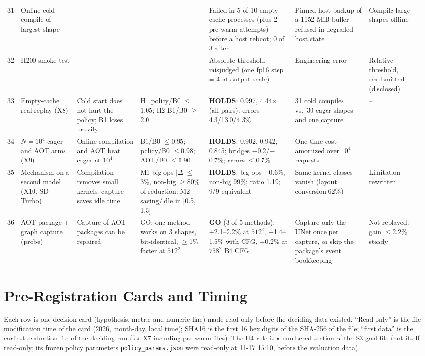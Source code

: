\documentclass[conference]{IEEEtran}
\newcommand{\tn}[1]{#1}%
\begin{document}
{\begin{longtable}{@{}P{0.4cm}P{2.2cm}P{2.6cm}P{2.6cm}P{3.3cm}P{3.2cm}P{2.2cm}@{}}
31 & Online cold compile of largest shape & -- & -- & Failed in 5 of 10 empty-cache processes (plus 2 pre-warm attempts) before a host reboot; 0 of 3 after & Pinned-host backup of a \tn{1152 MiB} buffer refused in degraded host state & Compile large shapes offline\\
32 & H200 smoke test & -- & -- & Absolute threshold misjudged (one fp16 step = 4 at output scale) & Engineering error & Relative threshold, resubmitted (disclosed)\\
33 & Empty-cache real replay (X8) & Cold start does not hurt the policy; B1 loses heavily & H1 policy/B0 $\le$1.05; H2 B1/B0 $\ge$2.0 & \textbf{HOLDS}: \tn{0.997}, \tn{4.44}$\times$ (all pairs); errors \tn{4.3/13.0/4.3\%} & 31 cold compiles vs.\ 30 eager shapes and one capture & --\\
34 & $N{=}10^4$ eager and AOT arms (X9) & Online compilation and AOT beat eager at $10^4$ & B1/B0 $\le$0.95; policy/B0 $\le$0.98; AOT/B0 $\le$0.90 & \textbf{HOLDS}: \tn{0.902}, \tn{0.942}, \tn{0.845}; bridges \tn{$-$0.2/$-$0.7\%}; errors $\le$\tn{0.7\%} & One-time cost amortized over $10^4$ requests & --\\
35 & Mechanism on a second model (X10, SD-Turbo) & Compilation removes small kernels; capture saves idle time & M1 big ops $|\Delta|{\le}$3\%, non-big $\ge$80\% of reduction; M2 saving/idle in [0.5, 1.5] & \textbf{HOLDS}: big ops \tn{$-$0.6\%}, non-big \tn{99\%}; ratio \tn{1.19}; 9/9 equivalent & Same kernel classes vanish (layout conversion \tn{62\%}) & Limitation rewritten\\
36 & AOT package + graph capture (probe) & Capture of AOT packages can be repaired & GO: one method works on 3 shapes, bit-identical, $\ge$1\% faster at $512^2$ & \textbf{GO} (3 of 5 methods): \tn{+2.1--2.2\%} at $512^2$, \tn{+1.4--1.5\%} with CFG, \tn{+0.2\%} at $768^2$ B4 CFG & Capture only the UNet once per capture, or skip the package's event bookkeeping & Not replayed: gain $\le$\tn{2.2\%} steady\\
\end{longtable}
}

\section{Pre-Registration Cards and Timing}\label{app:cards}
Each row is one decision card (hypothesis, metric and numeric line) made read-only before the deciding data existed. ``Read-only'' is the file modification time of the card (2026, month-day, local time); SHA16 is the first 16 hex digits of the SHA-256 of the file; ``first data'' is the earliest evaluation file of the deciding run (for X7 including pre-warm files). The H4 rule is a numbered section of the S3 goal file (not itself read-only; its frozen policy parameters \texttt{policy\_params.json} were read-only at 11-17 15:10, before the evaluation data).
\end{document}
